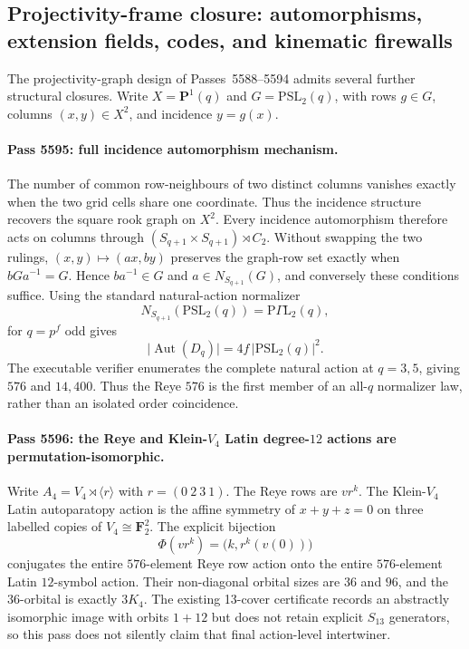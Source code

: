 \subsection{Projectivity-frame closure: automorphisms, extension fields, codes, and kinematic firewalls}
\label{sec:pass5595-5602-projectivity-closure-toe}

The projectivity-graph design of Passes~5588--5594 admits several further
structural closures.  Write $X=\mathbf P^1(q)$ and
$G=\mathrm{PSL}_2(q)$, with rows $g\in G$, columns $(x,y)\in X^2$, and
incidence $y=g(x)$.

\paragraph{Pass 5595: full incidence automorphism mechanism.}
The number of common row-neighbours of two distinct columns vanishes exactly
when the two grid cells share one coordinate.  Thus the incidence structure
recovers the square rook graph on $X^2$.  Every incidence automorphism therefore
acts on columns through $(S_{q+1}\times S_{q+1})\rtimes C_2$.  Without swapping
the two rulings, $(x,y)\mapsto(ax,by)$ preserves the graph-row set exactly when
$bGa^{-1}=G$.  Hence $ba^{-1}\in G$ and
$a\in N_{S_{q+1}}(G)$, and conversely these conditions suffice.  Using the
standard natural-action normalizer
\[
N_{S_{q+1}}(\mathrm{PSL}_2(q))=\mathrm P\Gamma\mathrm L_2(q),
\]
for $q=p^f$ odd gives
\[
\boxed{\lvert\operatorname{Aut}(D_q)\rvert
 =4f\,\lvert\mathrm{PSL}_2(q)\rvert^2.}
\]
The executable verifier enumerates the complete natural action at $q=3,5$,
giving $576$ and $14{,}400$.  Thus the Reye $576$ is the first member of an
all-$q$ normalizer law, rather than an isolated order coincidence.

\paragraph{Pass 5596: the Reye and Klein-$V_4$ Latin degree-$12$ actions are
permutation-isomorphic.}
Write $A_4=V_4\rtimes\langle r\rangle$ with
$r=(0\ 2\ 3\ 1)$.  The Reye rows are $vr^k$.  The Klein-$V_4$ Latin
autoparatopy action is the affine symmetry of $x+y+z=0$ on three labelled
copies of $V_4\cong\mathbf F_2^2$.  The explicit bijection
\[
\boxed{\Phi(vr^k)=\bigl(k,r^k(v(0))\bigr)}
\]
conjugates the entire $576$-element Reye row action onto the entire
$576$-element Latin $12$-symbol action.  Their non-diagonal orbital sizes are
$36$ and $96$, and the $36$-orbital is exactly $3K_4$.  The existing 13-cover
certificate records an abstractly isomorphic image with orbits $1+12$ but does
not retain explicit $S_{13}$ generators, so this pass does not silently claim
that final action-level intertwiner.

